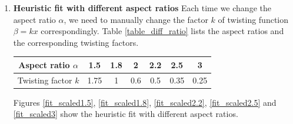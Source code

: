 \documentclass{article}
\begin{document}
\begin{enumerate}
\item {\bf Heuristic fit with different aspect ratios}
Each time we change the aspect ratio $\alpha$, we need to manually change the factor $k$ of twisting function $\beta = kx$ correspondingly. Table \ref{table_diff_ratio} lists the aspect ratios and the corresponding twisting factors.

\begin{center}
\begin{tabular}{ c|c|c|c|c|c|c } 
 \hline
 Aspect ratio $\alpha$ & 1.5  & 1.8 & 2   & 2.2 & 2.5  & 3    \\
 \hline
 Twisting factor $k$   & 1.75 & 1   & 0.6 & 0.5 & 0.35 & 0.25 \\
 \hline
\end{tabular}
\label{table_diff_ratio}
\end{center}

Figures \ref{fit_scaled1.5}, \ref{fit_scaled1.8}, \ref{fit_scaled2.2}, \ref{fit_scaled2.5} and \ref{fit_scaled3} show the heuristic fit with different aspect ratios.


\end{enumerate}
\end{document}

